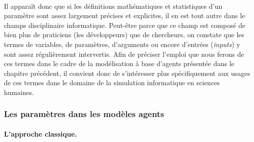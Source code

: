 \paragraph*{} Il apparaît donc que si les définitions mathématiques et statistiques d'un paramètre sont assez largement précises et explicites, il en est tout autre dans le champs disciplinaire informatique.
Peut-être parce que ce champ est composé de bien plus de praticiens (les développeurs) que de chercheurs, on constate que les termes de variables, de paramètres, d'arguments ou encore d'entrées (\textit{inputs}) y sont assez régulièrement intervertis.
Afin de préciser l'emploi que nous ferons de ces termes dans le cadre de la modélisation à base d'agents présentée dans le chapitre précédent, il convient donc de s'intéresser plus spécifiquement aux usages de ces termes dans le domaine de la simulation informatique en sciences humaines.

\subsubsection{Les paramètres dans les modèles agents}

\paragraph{L'approche classique.}

